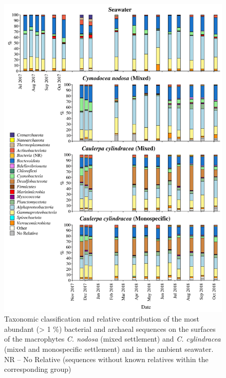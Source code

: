 \documentclass[12pt,]{article}
\begin{document}
\begin{figure}[H]

{\centering \includegraphics[width=0.85\linewidth]{../results/figures/community_bar_plot} 

}

\caption{Taxonomic classification and relative contribution of the most abundant (> 1 \si{\percent}) bacterial and archaeal sequences on the surfaces of the macrophytes \textit{C. nodosa} (mixed settlement) and \textit{C. cylindracea} (mixed and monospecific settlement) and in the ambient seawater. NR -- No Relative (sequences without known relatives within the corresponding group)\label{community}}\label{fig:unnamed-chunk-4}
\end{figure}
\end{document}
